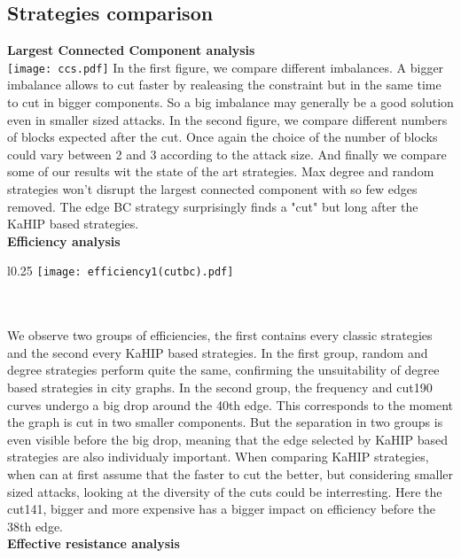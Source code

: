 \subsection{Strategies comparison}
\textbf{Largest Connected Component analysis}\\
\texttt{[image: ccs.pdf]}
In the first figure, we compare different imbalances. A bigger imbalance allows to cut faster by realeasing the constraint but in the same time to cut in bigger components. So a big imbalance may generally be a good solution even in smaller sized attacks. In the second figure, we compare different numbers of blocks expected after the cut. Once again the choice of the number of blocks could vary between 2 and 3 according to the attack size. And finally we compare some of our results wit the state of the art strategies. Max degree and random strategies won't disrupt the largest connected component with so few edges removed. The edge BC strategy surprisingly finds a "cut" but long after the KaHIP based strategies.
\vspace{10pt}\\
\textbf{Efficiency analysis}\\
\begin{wrapfigure}[19]{l}{0.25\textwidth}
    \texttt{[image: efficiency1(cutbc).pdf]}
\end{wrapfigure}\\
\vspace{10pt}\\
We observe two groups of efficiencies, the first contains every classic strategies and the second every KaHIP based strategies. In the first group, random and degree strategies perform quite the same, confirming the unsuitability of degree based strategies in city graphs. In the second group, the frequency and cut190 curves undergo a big drop around the 40th edge. This corresponds to the moment the graph is cut in two smaller components. But the separation in two groups is even visible before the big drop, meaning that the edge selected by KaHIP based strategies are also individualy important. When comparing KaHIP strategies, when can at first assume that the faster to cut the better, but considering smaller sized attacks, looking at the diversity of the cuts could be interresting. Here the cut141, bigger and more expensive has a bigger impact on efficiency before the 38th edge.\\
\textbf{Effective resistance analysis}
